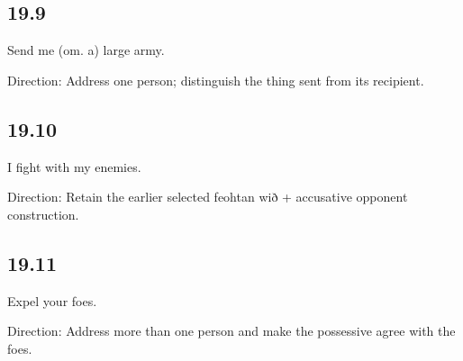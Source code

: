 \subsection*{19.9}

\par\begin{minipage}{\linewidth}\raggedright
Send me (om. a) large army.

Direction: Address one person; distinguish the thing sent from its recipient.

\end{minipage}\par\addvspace{4pt}

\subsection*{19.10}

\par\begin{minipage}{\linewidth}\raggedright
I fight with my enemies.

Direction: Retain the earlier selected feohtan wið + accusative opponent construction.

\end{minipage}\par\addvspace{4pt}

\subsection*{19.11}

\par\begin{minipage}{\linewidth}\raggedright
Expel your foes.

Direction: Address more than one person and make the possessive agree with the foes.

\end{minipage}\par\addvspace{4pt}

